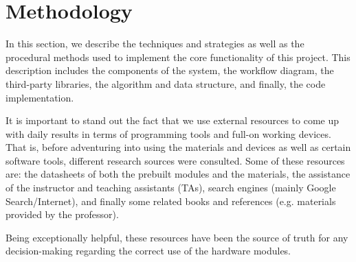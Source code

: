 %
%
%


\section{Methodology}
In this section, we describe the techniques and strategies as well as the procedural methods used to implement the core functionality of this project. This description includes the components of the system, the workflow diagram, the third-party libraries, the algorithm and data structure, and finally, the code implementation.

It is important to stand out the fact that we use external resources to come up with daily results in terms of programming tools and full-on working devices. That is, before adventuring into using the materials and devices as well as certain software tools, different research sources were consulted. Some of these resources are: the datasheets of both the prebuilt modules and the materials, the assistance of the instructor and teaching assistants (TAs), search engines (mainly Google Search/Internet), and finally some related books and references (e.g. materials provided by the professor).

Being exceptionally helpful, these resources have been the source of truth for any decision-making regarding the correct use of the hardware modules.

